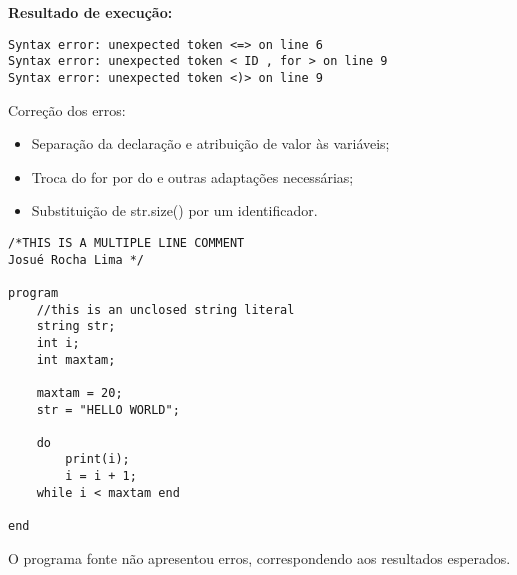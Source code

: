         \textbf{Resultado de execução:}
        
 \begin{lstlisting}
Syntax error: unexpected token <=> on line 6
Syntax error: unexpected token < ID , for > on line 9
Syntax error: unexpected token <)> on line 9
\end{lstlisting}

Correção dos erros:

\begin{itemize}
    \item Separação da declaração e atribuição de valor às variáveis;
    
    \item Troca do for por do e outras adaptações necessárias;
    
    \item Substituição de str.size() por um identificador.
\end{itemize}

\begin{lstlisting}
/*THIS IS A MULTIPLE LINE COMMENT
Josué Rocha Lima */

program
	//this is an unclosed string literal
	string str;
	int i;
	int maxtam;
	
	maxtam = 20;
	str = "HELLO WORLD";
	
	do 
		print(i);
		i = i + 1;
	while i < maxtam end

end
\end{lstlisting}

O programa fonte não apresentou erros, correspondendo aos resultados esperados.






